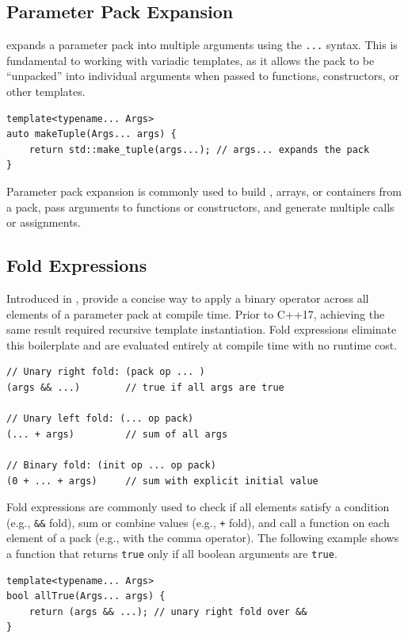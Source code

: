 \subsection{Parameter Pack Expansion}
 expands a parameter pack into multiple arguments using the \texttt{...} syntax. This is fundamental to working with variadic templates, as it allows the pack to be ``unpacked'' into individual arguments when passed to functions, constructors, or other templates.
\begin{lstlisting}
template<typename... Args>
auto makeTuple(Args... args) {
    return std::make_tuple(args...); // args... expands the pack
}
\end{lstlisting}
Parameter pack expansion is commonly used to build , arrays, or containers from a pack, pass arguments to functions or constructors, and generate multiple calls or assignments.

\subsection{Fold Expressions}
Introduced in ,  provide a concise way to apply a binary operator across all elements of a parameter pack at compile time. Prior to C++17, achieving the same result required recursive template instantiation. Fold expressions eliminate this boilerplate and are evaluated entirely at compile time with no runtime cost.
\begin{lstlisting}
// Unary right fold: (pack op ... )
(args && ...)        // true if all args are true

// Unary left fold: (... op pack)
(... + args)         // sum of all args

// Binary fold: (init op ... op pack)
(0 + ... + args)     // sum with explicit initial value
\end{lstlisting}
Fold expressions are commonly used to check if all elements satisfy a condition (e.g., \texttt{\&\&} fold), sum or combine values (e.g., \texttt{+} fold), and call a function on each element of a pack (e.g., with the comma operator). The following example shows a function that returns \texttt{true} only if all boolean arguments are \texttt{true}.
\begin{lstlisting}
template<typename... Args>
bool allTrue(Args... args) {
    return (args && ...); // unary right fold over &&
}
\end{lstlisting}

